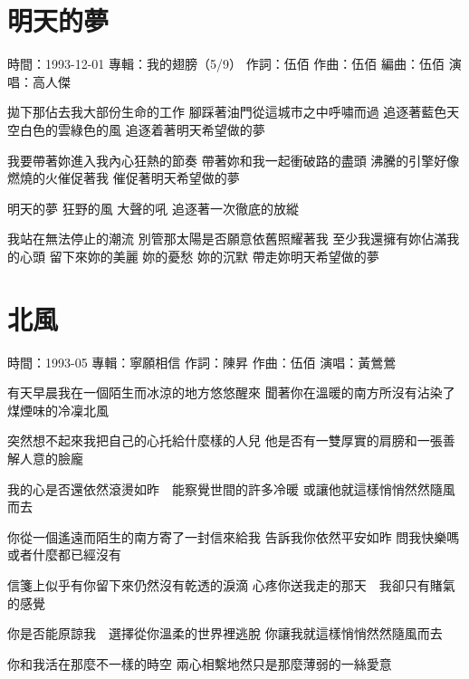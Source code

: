 \documentclass[UTF8,a4paper,oneside,twocolumn,12pt]{ctexbook}
\newcommand{\infopair}[2]{\textbullet #1：#2}
\newcommand{\zc}[1][伍佰]{\infopair{作詞}{#1}}
\newcommand{\zq}[1][伍佰]{\infopair{作曲}{#1}}
\newcommand{\bq}[1][伍佰]{\infopair{編曲}{#1}}
\newcommand{\zj}[1]{\infopair{專輯}{#1}}
\newcommand{\sj}[1]{\infopair{時間}{#1}}
\newenvironment{info}{\begin{flushleft}\kaishu
	}
	{\end{flushleft}\normalsize\yahei\par}
\newenvironment{lyric}{
	}
{}
\begin{document}
\section{明天的夢}
\begin{info}
	\sj{1993-12-01}
	\zj{我的翅膀（5/9）}
	\zc
	\zq
	\bq
	\infopair{演唱}{高人傑}
\end{info}
\begin{lyric}
	拋下那佔去我大部份生命的工作
	腳踩著油門從這城市之中呼嘯而過
	追逐著藍色天空白色的雲綠色的風
	追逐着著明天希望做的夢

	我要帶著妳進入我內心狂熱的節奏
	帶著妳和我一起衝破路的盡頭
	沸騰的引擎好像燃燒的火催促著我
	催促著明天希望做的夢

	明天的夢 狂野的風 大聲的吼
	追逐著一次徹底的放縱

	我站在無法停止的潮流
	別管那太陽是否願意依舊照耀著我
	至少我還擁有妳佔滿我的心頭
	留下來妳的美麗 妳的憂愁 妳的沉默
	帶走妳明天希望做的夢
\end{lyric}

\section{北風}
\begin{info}
	\sj{1993-05}
	\zj{寧願相信}
	\zc[陳昇]
	\zq
	\infopair{演唱}{黃鶯鶯}
\end{info}
\begin{lyric}
	有天早晨我在一個陌生而冰涼的地方悠悠醒來
	聞著你在溫暖的南方所沒有沾染了煤煙味的冷凜北風

	突然想不起來我把自己的心托給什麼樣的人兒
	他是否有一雙厚實的肩膀和一張善解人意的臉龐

	我的心是否還依然滾燙如昨　能察覺世間的許多冷暖
	或讓他就這樣悄悄然然隨風而去

	你從一個遙遠而陌生的南方寄了一封信來給我
	告訴我你依然平安如昨
	問我快樂嗎　或者什麼都已經沒有

	信箋上似乎有你留下來仍然沒有乾透的淚滴
	心疼你送我走的那天　我卻只有賭氣的感覺

	你是否能原諒我　選擇從你溫柔的世界裡逃脫
	你讓我就這樣悄悄然然隨風而去

	你和我活在那麼不一樣的時空
	兩心相繫地然只是那麼薄弱的一絲愛意
\end{lyric}
\end{document}
